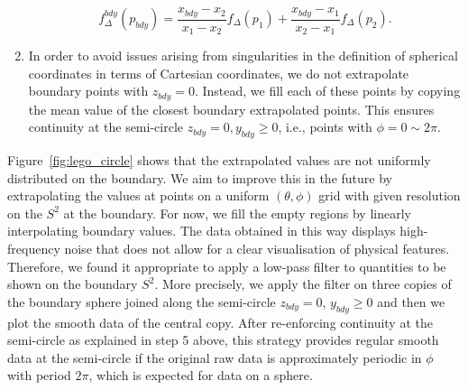\documentclass[a4paper,11pt]{article}
\numberwithin{equation}{section}
\begin{document}
\begin{enumerate}
 \begin{equation}
 \label{eq:firstordextrap}
 f^{bdy}_{\Delta}(p_{bdy})=\frac{x_{bdy}-x_2}{x_1-x_2}f_\Delta(p_1)+\frac{x_{bdy}-x_1}{x_2-x_1}f_\Delta(p_2).
 \end{equation}
 \item In order to avoid issues arising from singularities in the definition of spherical coordinates in terms of Cartesian coordinates, we do not extrapolate boundary points with $z_{bdy}=0$. 
Instead, we fill each of these points by copying the mean value of the closest boundary extrapolated points. This ensures continuity at the semi-circle $z_{bdy}=0, y_{bdy}\geq 0$, i.e., points with $\phi=0\sim 2\pi$.
 \end{enumerate}
 
 Figure~\ref{fig:lego_circle} shows that the extrapolated values are not uniformly distributed on the boundary. 
 We aim to improve this in the future by extrapolating the values at points on a uniform $(\theta,\phi)$ grid with given resolution on the $S^2$ at the boundary. For now, we fill the empty regions by linearly interpolating boundary values. The data obtained in this way displays high-frequency noise that does not allow for a clear visualisation of physical features. Therefore, we found it appropriate to apply a low-pass filter to quantities to be shown on the boundary $S^2$. More precisely, we apply the filter on three copies of the boundary sphere joined along the semi-circle $z_{bdy}=0$, $y_{bdy}\geq 0$ and then we plot the smooth data of the central copy. After re-enforcing continuity at the semi-circle as explained in step 5 above, this strategy provides regular smooth data at the semi-circle if the original raw data is approximately periodic in $\phi$ with period $2\pi$, which is expected for data on a sphere.
\end{document}
